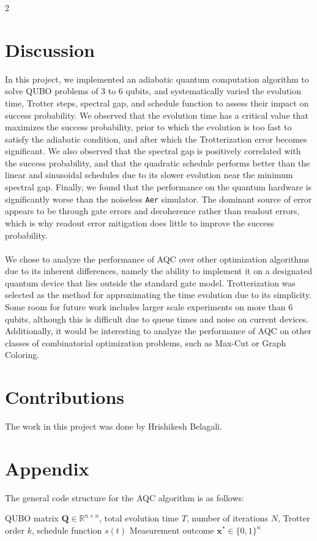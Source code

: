 \documentclass[10pt]{article}
\begin{document}
\begin{multicols*}{2}
\section{Discussion}
In this project, we implemented an adiabatic quantum computation algorithm to solve QUBO problems of 3 to 6 qubits, and systematically varied the evolution time, Trotter steps, spectral gap, and schedule function to assess their impact on success probability. We observed that the evolution time has a critical value that maximizes the success probability, prior to which the evolution is too fast to satisfy the adiabatic condition, and after which the Trotterization error becomes significant. We also observed that the spectral gap is positively correlated with the success probability, and that the quadratic schedule performs better than the linear and sinusoidal schedules due to its slower evolution near the minimum spectral gap. Finally, we found that the performance on the quantum hardware is significantly worse than the noiseless \texttt{Aer} simulator. The dominant source of error appears to be through gate errors and decoherence rather than readout errors, which is why readout error mitigation does little to improve the success probability. \\\\
We chose to analyze the performance of AQC over other optimization algorithms due to its inherent differences, namely the ability to implement it on a designated quantum device that lies outside the standard gate model. Trotterization was selected as the method for approximating the time evolution due to its simplicity. Some room for future work includes larger scale experiments on more than 6 qubits, although this is difficult due to queue times and noise on current devices. Additionally, it would be interesting to analyze the performance of AQC on other classes of combinatorial optimization problems, such as Max-Cut or Graph Coloring.
\section{Contributions}
The work in this project was done by Hrishikesh Belagali. 
\section*{Appendix}
The general code structure for the AQC algorithm is as follows:
{\small
\begin{algorithmic}[1]
\Require QUBO matrix $\mathbf{Q} \in \mathbb{R}^{n \times n}$, total evolution time $T$, number of iterations $N$, Trotter order $k$, schedule function $s(t)$
\Ensure Measurement outcome $\mathbf{x}^* \in \{0,1\}^n$


\end{algorithmic}}
\end{multicols*}
\end{document}

